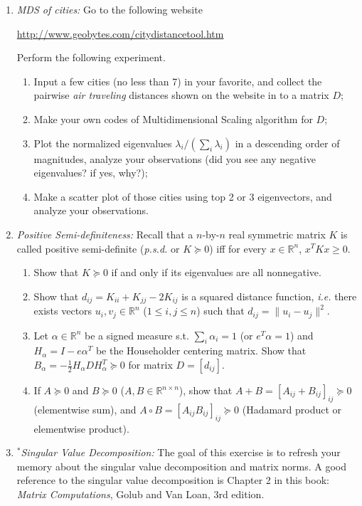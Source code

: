 \documentclass[11pt]{article}
\def\R{{\mathbb R}}
\begin{document}
\begin{enumerate}
\item {\em MDS of cities:} Go to the following website

\url{http://www.geobytes.com/citydistancetool.htm}

Perform the following experiment. 
\begin{enumerate}
\item Input a few cities (no less than 7) in your favorite, and collect the pairwise \emph{air traveling} distances shown on the website in to a matrix $D$;
\item Make your own codes of Multidimensional Scaling algorithm for $D$;
\item Plot the normalized eigenvalues $\lambda_i / (\sum_i \lambda_i)$ in a descending order of magnitudes, analyze your observations (did you see any negative eigenvalues? if yes, why?);
\item Make a scatter plot of those cities using top 2 or 3 eigenvectors, and analyze your observations. 
\end{enumerate}



\item {\em Positive Semi-definiteness:} Recall that a $n$-by-$n$ real symmetric matrix $K$ is called positive semi-definite (\emph{p.s.d.} or $K\succeq 0$) iff for every $x\in \R^n$, $x^T K x\geq 0$. 
\begin{enumerate}
\item Show that $K\succeq 0$ if and only if its eigenvalues are all nonnegative.
\item Show that $d_{ij}=K_{ii} + K_{jj} - 2 K_{ij}$ is a squared distance function, \emph{i.e.} there exists vectors $u_i,v_j \in \R^n$ ($1\leq i,j \leq n$) such that $d_{ij} = \|u_i - u_j\|^2$. 
\item Let $\alpha\in \R^n$ be a signed measure s.t. $\sum_i \alpha_i = 1$ (or $e^T \alpha =1$) and $H_\alpha= I - e \alpha^T$ be the Householder centering matrix. Show that $B_\alpha= - \frac{1}{2} H_\alpha D H_\alpha^T\succeq 0$ for matrix $D=[d_{ij}]$. 
\item If $A\succeq 0$ and $B\succeq 0$ ($A,B\in \R^{n\times n}$), show that $A+B = [A_{ij} + B_{ij}]_{ij} \succeq 0$ (elementwise sum), and $A\circ B= [A_{ij} B_{ij}]_{ij} \succeq 0$ (Hadamard product or elementwise product).
\end{enumerate}

\item {\em $^*$Singular Value Decomposition:} The goal of this exercise is to refresh your memory about the singular value decomposition and matrix norms. A good reference to the singular value decomposition is Chapter 2 in this book:\\
{\em Matrix Computations}, Golub and Van Loan, 3rd edition.\\


\end{enumerate}
\end{document}
